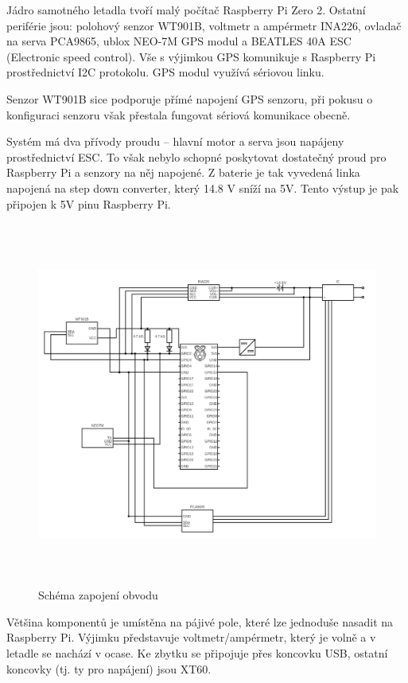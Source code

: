 \documentclass[a4paper,oneside,12pt]{report}
\begin{document}
Jádro samotného letadla tvoří malý počítač Raspberry Pi Zero 2.
Ostatní periférie jsou: polohový senzor WT901B, voltmetr a ampérmetr INA226, ovladač na serva PCA9865, ublox NEO-7M GPS modul a BEATLES 40A ESC (Electronic speed control).
Vše s výjimkou GPS komunikuje s Raspberry Pi prostřednictví I2C protokolu.
GPS modul využívá sériovou linku.

Senzor WT901B sice podporuje přímé napojení GPS senzoru, při pokusu o konfiguraci senzoru však přestala fungovat sériová komunikace obecně.

Systém má dva přívody proudu -- hlavní motor a serva jsou napájeny prostřednictví ESC.
To však nebylo schopné poskytovat dostatečný proud pro Raspberry Pi a senzory na něj napojené.
Z baterie je tak vyvedená linka napojená na step down converter, který 14.8 V sníží na 5V.
Tento výstup je pak připojen k 5V pinu Raspberry Pi.

\begin{figure}[h]
  \centering
  \includegraphics[height=12cm]{../img/schema.png}
  \caption[Schéma zapojení obvodu]{Schéma zapojení obvodu}
\end{figure}

\newpage


Většina komponentů je umístěna na pájivé pole, které lze jednoduše nasadit na Raspberry Pi.
Výjimku představuje voltmetr/ampérmetr, který je volně a v letadle se nachází v ocase.
Ke zbytku se připojuje přes koncovku USB, ostatní koncovky (tj. ty pro napájení) jsou XT60.
\end{document}
